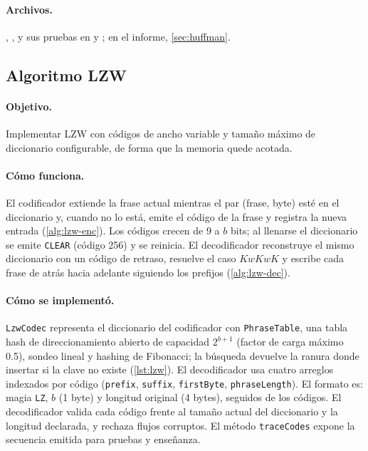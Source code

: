 \paragraph{Archivos.} ,
,
 y sus pruebas en
 y ; en el informe,
\cref{sec:huffman}.

\subsection{Algoritmo LZW}
\label{app:detalle-b}
\paragraph{Objetivo.} Implementar LZW con códigos de ancho variable y tamaño máximo de
diccionario configurable, de forma que la memoria quede acotada.

\paragraph{Cómo funciona.} El codificador extiende la frase actual mientras el par (frase,
byte) esté en el diccionario y, cuando no lo está, emite el código de la frase y registra la
nueva entrada (\cref{alg:lzw-enc}). Los códigos crecen de 9 a $b$ bits; al llenarse el
diccionario se emite \texttt{CLEAR} (código 256) y se reinicia. El decodificador reconstruye el
mismo diccionario con un código de retraso, resuelve el caso $KwKwK$ y escribe cada frase de
atrás hacia adelante siguiendo los prefijos (\cref{alg:lzw-dec}).

\paragraph{Cómo se implementó.} \texttt{LzwCodec} representa el diccionario del codificador con
\texttt{PhraseTable}, una tabla hash de direccionamiento abierto de capacidad $2^{b+1}$ (factor de
carga máximo 0.5), sondeo lineal y hashing de Fibonacci; la búsqueda devuelve la ranura donde
insertar si la clave no existe (\cref{lst:lzw}). El decodificador usa cuatro arreglos indexados
por código (\texttt{prefix}, \texttt{suffix}, \texttt{firstByte}, \texttt{phraseLength}). El
formato es: magia \texttt{LZ}, $b$ (1 byte) y longitud original (4 bytes), seguidos de los
códigos. El decodificador valida cada código frente al tamaño actual del diccionario y la
longitud declarada, y rechaza flujos corruptos. El método \texttt{traceCodes} expone la
secuencia emitida para pruebas y enseñanza.

